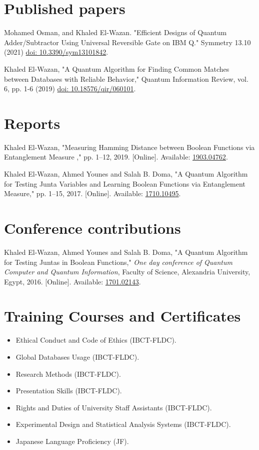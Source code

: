 \documentclass[margin,line,a4paper]{resume}
\newcommand*{\doi}[1]{\href{http://dx.doi.org/#1}{doi: #1}}
\begin{document}
\begin{resume}
\begin{description}
    \end{description}



\section{ \mysidestyle Published papers}

Mohamed Osman, and Khaled El-Wazan. "Efficient Designs of Quantum Adder/Subtractor Using Universal Reversible Gate on IBM Q." Symmetry 13.10 (2021) \doi{10.3390/sym13101842}.
    
    
Khaled El-Wazan, "A Quantum Algorithm for Finding Common Matches between Databases with Reliable Behavior," Quantum Information Review, vol. 6, pp. 1-6 (2019) \doi{10.18576/qir/060101}.


\section{\mysidestyle Reports}

Khaled El-Wazan, "Measuring Hamming Distance between Boolean Functions via Entanglement Measure ,"  pp. 1--12, 2019. 
[Online]. Available: \href{http://arxiv.org/abs/1903.04762}{1903.04762}.



Khaled El-Wazan, Ahmed Younes and Salah B. Doma, "A Quantum Algorithm for Testing Junta Variables and Learning Boolean Functions via Entanglement Measure,"  pp. 1--15, 2017. 
[Online]. Available: \href{http://arxiv.org/abs/1710.10495}{1710.10495}.



\section{ \mysidestyle Conference contributions}


Khaled El-Wazan, Ahmed Younes and Salah B. Doma, "A Quantum Algorithm for Testing Juntas in Boolean Functions," \textit{One day conference of Quantum Computer and Quantum Information}, Faculty of Science, Alexandria University, Egypt, 2016. [Online]. Available: \href{http://arxiv.org/abs/1701.02143}{1701.02143}.


\section{\mysidestyle Training Courses and Certificates}
\begin{itemize}

\item Ethical Conduct and Code of Ethics (IBCT-FLDC).
\item Global Databases Usage (IBCT-FLDC).
\item Research Methods (IBCT-FLDC).
\item Presentation Skills (IBCT-FLDC).
\item Rights and Duties of University Staff Assistants (IBCT-FLDC).
\item Experimental Design and Statistical Analysis Systems (IBCT-FLDC).
\item Japanese Language Proficiency (JF).


\end{itemize}
\end{resume}
\end{document}

